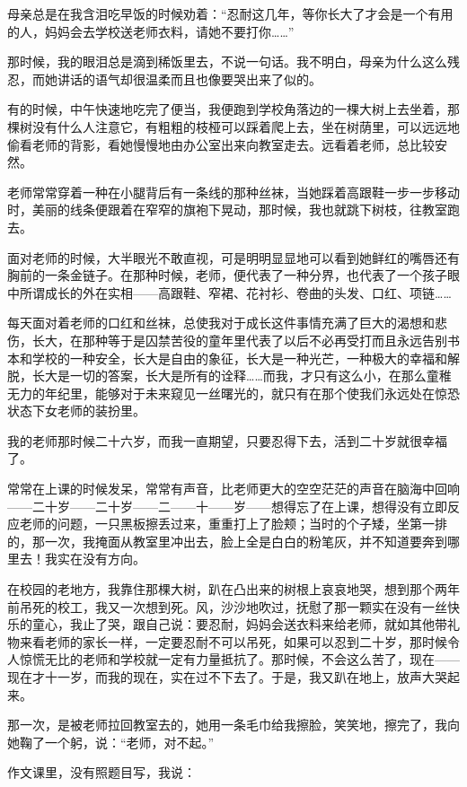 \par 母亲总是在我含泪吃早饭的时候劝着：“忍耐这几年，等你长大了才会是一个有用的人，妈妈会去学校送老师衣料，请她不要打你……”
\par 那时候，我的眼泪总是滴到稀饭里去，不说一句话。我不明白，母亲为什么这么残忍，而她讲话的语气却很温柔而且也像要哭出来了似的。
\par 有的时候，中午快速地吃完了便当，我便跑到学校角落边的一棵大树上去坐着，那棵树没有什么人注意它，有粗粗的枝桠可以踩着爬上去，坐在树荫里，可以远远地偷看老师的背影，看她慢慢地由办公室出来向教室走去。远看着老师，总比较安然。
\par 老师常常穿着一种在小腿背后有一条线的那种丝袜，当她踩着高跟鞋一步一步移动时，美丽的线条便跟着在窄窄的旗袍下晃动，那时候，我也就跳下树枝，往教室跑去。
\par 面对老师的时候，大半眼光不敢直视，可是明明显显地可以看到她鲜红的嘴唇还有胸前的一条金链子。在那种时候，老师，便代表了一种分界，也代表了一个孩子眼中所谓成长的外在实相——高跟鞋、窄裙、花衬衫、卷曲的头发、口红、项链……
\par 每天面对着老师的口红和丝袜，总使我对于成长这件事情充满了巨大的渴想和悲伤，长大，在那种等于是囚禁苦役的童年里代表了以后不必再受打而且永远告别书本和学校的一种安全，长大是自由的象征，长大是一种光芒，一种极大的幸福和解脱，长大是一切的答案，长大是所有的诠释……而我，才只有这么小，在那么童稚无力的年纪里，能够对于未来窥见一丝曙光的，就只有在那个使我们永远处在惊恐状态下女老师的装扮里。
\par 我的老师那时候二十六岁，而我一直期望，只要忍得下去，活到二十岁就很幸福了。
\par 常常在上课的时候发呆，常常有声音，比老师更大的空空茫茫的声音在脑海中回响——二十岁——二十岁——二——十——岁——想得忘了在上课，想得没有立即反应老师的问题，一只黑板擦丢过来，重重打上了脸颊；当时的个子矮，坐第一排的，那一次，我掩面从教室里冲出去，脸上全是白白的粉笔灰，并不知道要奔到哪里去！我实在没有方向。
\par 在校园的老地方，我靠住那棵大树，趴在凸出来的树根上哀哀地哭，想到那个两年前吊死的校工，我又一次想到死。风，沙沙地吹过，抚慰了那一颗实在没有一丝快乐的童心，我止了哭，跟自己说：要忍耐，妈妈会送衣料来给老师，就如其他带礼物来看老师的家长一样，一定要忍耐不可以吊死，如果可以忍到二十岁，那时候令人惊慌无比的老师和学校就一定有力量抵抗了。那时候，不会这么苦了，现在——现在才十一岁，而我的现在，实在过不下去了。于是，我又趴在地上，放声大哭起来。
\par 那一次，是被老师拉回教室去的，她用一条毛巾给我擦脸，笑笑地，擦完了，我向她鞠了一个躬，说：“老师，对不起。”
\par 作文课里，没有照题目写，我说：
